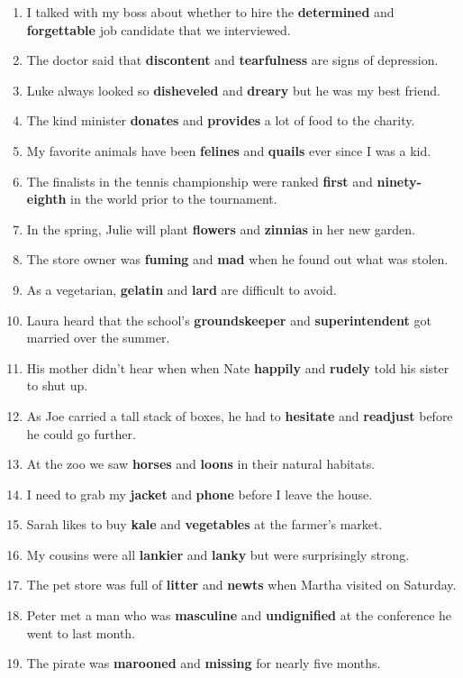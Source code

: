 \documentclass[authoryear]{elsarticle}
\begin{document}
\begin{enumerate}
\item I talked with my boss about whether to hire the \textbf{determined} and \textbf{forgettable} job candidate that we interviewed.
\item The doctor said that \textbf{discontent} and \textbf{tearfulness} are signs of depression.
\item Luke always looked so \textbf{disheveled} and \textbf{dreary} but he was my best friend.
\item The kind minister \textbf{donates} and \textbf{provides} a lot of food to the charity.
\item My favorite animals have been \textbf{felines} and \textbf{quails} ever since I was a kid.
\item The finalists in the tennis championship were ranked \textbf{first} and \textbf{ninety-eighth} in the world prior to the tournament.
\item In the spring, Julie will plant \textbf{flowers} and \textbf{zinnias} in her new garden.
\item The store owner was \textbf{fuming} and \textbf{mad} when he found out what was stolen.
\item As a vegetarian, \textbf{gelatin} and \textbf{lard} are difficult to avoid.
\item Laura heard that the school's \textbf{groundskeeper} and \textbf{superintendent} got married over the summer.
\item His mother didn't hear when when Nate \textbf{happily} and \textbf{rudely} told his sister to shut up.
\item As Joe carried a tall stack of boxes, he had to \textbf{hesitate} and \textbf{readjust} before he could go further.
\item At the zoo we saw \textbf{horses} and \textbf{loons} in their natural habitats.
\item I need to grab my \textbf{jacket} and \textbf{phone} before I leave the house.
\item Sarah likes to buy \textbf{kale} and \textbf{vegetables} at the farmer's market.
\item My cousins were all \textbf{lankier} and \textbf{lanky} but were surprisingly strong.
\item The pet store was full of \textbf{litter} and \textbf{newts} when Martha visited on Saturday.
\item Peter met a man who was \textbf{masculine} and \textbf{undignified} at the conference he went to last month.
\item The pirate was \textbf{marooned} and \textbf{missing} for nearly five months.

\end{enumerate}
\end{document}

